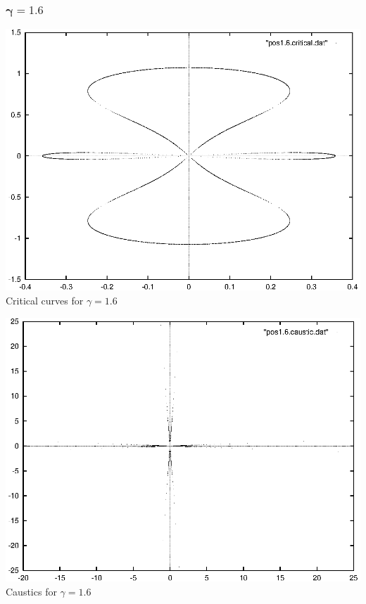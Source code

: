 \documentclass[a4paper]{IEEEtran}
\begin{document}
    \subsubsection{$\mathbf{\gamma = 1.6}$}
    \begin{center}
        \includegraphics{images/pos1-6-critical.eps} 
        \\[1mm]
         Critical curves for $\gamma = 1.6$
    \end{center}
    \begin{center}
        \includegraphics{images/pos1-6-caustic.eps} 
        \\[1mm]
         Caustics for $\gamma = 1.6$
    \end{center}
\end{document}
